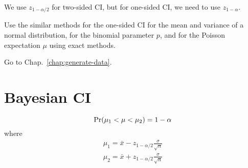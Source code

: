 \begin{framed}
  We use $z_{1-\alpha/2}$ for two-sided CI, but for one-sided CI, we
  need to use $z_{1-\alpha}$. 
\end{framed}
Use the similar methods for the one-sided CI for the mean and variance
of a normal distribution, for the binomial parameter $p$, and for the
Poisson expectation $\mu$ using exact methods.


Go to Chap.~\ref{chap:generate-data}.

\section{Bayesian CI}
\label{sec:bayesian-ci}

\begin{equation}
  \label{eq:67}
  \text{Pr}(\mu_1 < \mu < \mu_2) = 1-\alpha
\end{equation}
where
\begin{equation}
  \label{eq:68}
  \begin{split}
    \mu_1 = \bar{x} - z_{1-\alpha/2}\frac{\sigma}{\sqrt{n}} \\
    \mu_2 =  \bar{x} + z_{1-\alpha/2}\frac{\sigma}{\sqrt{n}} \\
  \end{split}
\end{equation}




